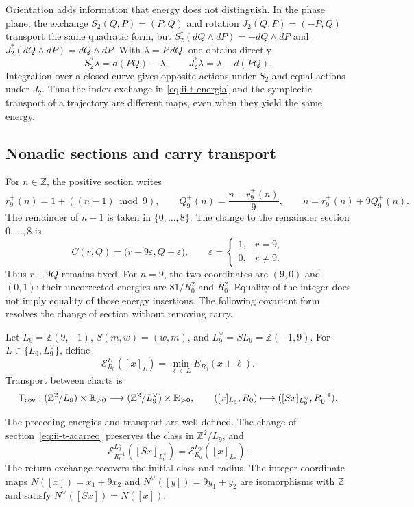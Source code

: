 Orientation adds information that energy does not distinguish. In the phase
plane, the exchange \(S_2(Q,P)=(P,Q)\) and rotation
\(J_2(Q,P)=(-P,Q)\) transport the same quadratic form, but
\(S_2^*(dQ\wedge dP)=-dQ\wedge dP\) and
\(J_2^*(dQ\wedge dP)=dQ\wedge dP\). With
\(\lambda=P\,dQ\), one obtains directly
\[
 S_2^*\lambda=d(PQ)-\lambda,\qquad
 J_2^*\lambda=\lambda-d(PQ).
\]
Integration over a closed curve gives opposite actions under \(S_2\)
and equal actions under \(J_2\). Thus the index exchange in
\eqref{eq:ii-t-energia} and the symplectic transport of a trajectory
are different maps, even when they yield the same energy.

\subsection{Nonadic sections and carry transport}

For \(n\in\mathbb Z\), the positive section writes
\[
 r_9^+(n)=1+((n-1)\bmod9),\qquad
 Q_9^+(n)=\frac{n-r_9^+(n)}9,\qquad n=r_9^+(n)+9Q_9^+(n).
\]
The remainder of \(n-1\) is taken in \(\{0,\ldots,8\}\). The change to
the remainder section \(0,\ldots,8\) is
\begin{equation}
 C(r,Q)=\bigl(r-9\varepsilon,Q+\varepsilon\bigr),\qquad
 \varepsilon=\begin{cases}1,&r=9,\\0,&r\ne9.\end{cases}
 \label{eq:ii-t-acarreo}
\end{equation}
Thus \(r+9Q\) remains fixed. For \(n=9\), the two coordinates
are \((9,0)\) and \((0,1)\): their uncorrected energies are
\(81/R_0^2\) and \(R_0^2\). Equality of the integer does not imply
equality of those energy insertions. The following covariant form
resolves the change of section without removing carry.

\begin{definition}
\label{def:ii-t-cociente}
Let \(L_9=\mathbb Z(9,-1)\), \(S(m,w)=(w,m)\), and
\(L_9^\vee=SL_9=\mathbb Z(-1,9)\). For
\(L\in\{L_9,L_9^\vee\}\), define
\[
 \mathcal E_{R_0}^{L}([x]_L)
 =\min_{\ell\in L}E_{R_0}(x+\ell).
\]
Transport between charts is
\[
 \mathsf T_{\rm cov}:
 (\mathbb Z^2/L_9)\times\mathbb R_{>0}
 \longrightarrow
 (\mathbb Z^2/L_9^\vee)\times\mathbb R_{>0},\qquad
 ([x]_{L_9},R_0)\longmapsto([Sx]_{L_9^\vee},R_0^{-1}).
\]
\end{definition}

\begin{theorem}
\label{thm:ii-t-cociente}
The preceding energies and transport are well defined. The change
of section~\eqref{eq:ii-t-acarreo} preserves the class in
\(\mathbb Z^2/L_9\), and
\begin{equation}
 \mathcal E_{R_0^{-1}}^{L_9^\vee}([Sx]_{L_9^\vee})
 =\mathcal E_{R_0}^{L_9}([x]_{L_9}).
 \label{eq:ii-t-covariancia}
\end{equation}
The return exchange recovers the initial class and radius. The
integer coordinate maps \(N([x])=x_1+9x_2\) and
\(N^\vee([y])=9y_1+y_2\) are isomorphisms with \(\mathbb Z\)
and satisfy \(N^\vee([Sx])=N([x])\).
\end{theorem}


